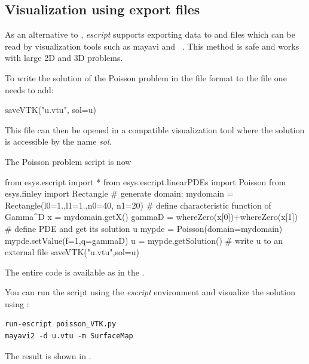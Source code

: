 \subsection{Visualization using export files}

As an alternative to \MATPLOTLIB, {\it escript} supports exporting data to
\VTK and \SILO files which can be read by visualization tools such as
mayavi\cite{mayavi} and \VisIt~\cite{VisIt}. This method is \MPI safe and
works with large 2D and 3D problems.

To write the solution  of the Poisson problem in the \VTK file format
to the file  one needs to add:
\begin{python}
  saveVTK("u.vtu", sol=u)
\end{python}
This file can then be opened in a \VTK compatible visualization tool where the
solution is accessible by the name {\it sol}.

The Poisson problem script is now 
\begin{python}
  from esys.escript import *
  from esys.escript.linearPDEs import Poisson
  from esys.finley import Rectangle
  # generate domain:
  mydomain = Rectangle(l0=1.,l1=1.,n0=40, n1=20)
  # define characteristic function of Gamma^D
  x = mydomain.getX()
  gammaD = whereZero(x[0])+whereZero(x[1])
  # define PDE and get its solution u
  mypde = Poisson(domain=mydomain)
  mypde.setValue(f=1,q=gammaD)
  u = mypde.getSolution()
  # write u to an external file
  saveVTK("u.vtu",sol=u)
\end{python}
The entire code is available as  in the \ExampleDirectory.

You can run the script using the {\it escript} environment and visualize the
solution using \mayavi:
\begin{verbatim}
run-escript poisson_VTK.py
mayavi2 -d u.vtu -m SurfaceMap
\end{verbatim}
The result is shown in .

